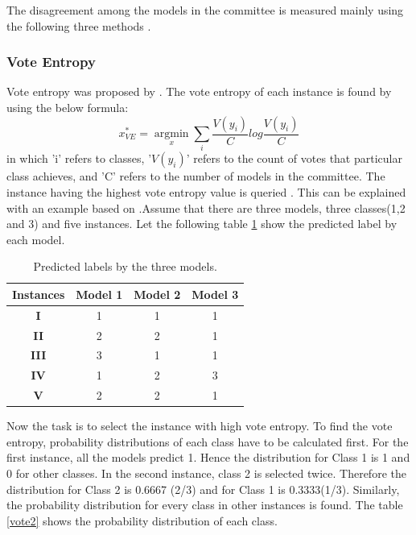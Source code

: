 The disagreement among the models in the committee is measured mainly using the following three methods \cite{Settles2010}.

\subsubsection{Vote Entropy}

Vote entropy was proposed by \cite{dagan1995committee}. The vote entropy of each instance is found by using the below formula: 
\begin{equation} 
x^{*}_{VE} = \operatorname*{argmin}_x \sum_{i} \frac{V(y_i)}{C} log\frac{V(y_i)}{C}
\end{equation} 
in which 'i' refers to classes, '$V(y_i)$' refers to the count of votes that particular class achieves, and 'C' refers to the  number of models in the committee. The instance having the highest vote entropy value is queried \cite{dagan1995committee} \cite{Settles2010}.
This can be explained with an example based on \cite{modal_disagree}.Assume that there are three models, three classes(1,2 and 3) and five instances. Let the following table \ref{vote1} show the predicted label by each model. \\
\begin{table}[h!]
\centering
	\begin{tabular}{|c|c|c|c|}
		\hline
		\textbf{Instances} & \textbf{Model 1} & \textbf{Model 2} & \textbf{Model 3} \\ \hline
		\textbf{I}         & 1                & 1                & 1                \\ \hline
		\textbf{II}        & 2                & 2                & 1                \\ \hline
		\textbf{III}       & 3                & 1                & 1                \\ \hline
		\textbf{IV}        & 1                & 2                & 3                \\ \hline
		\textbf{V}         & 2                & 2                & 1                \\ \hline
	\end{tabular}
\caption{Predicted labels by the three models.}
\label{vote1}
\end{table}
Now the task is to select the instance with high vote entropy.  To find the vote entropy, probability distributions of each class have to be calculated first.  For the first instance, all the models predict 1. Hence the distribution for Class 1 is 1 and 0 for other classes. In the second instance, class 2 is selected twice. Therefore the distribution for Class 2 is 0.6667 (2/3) and for Class 1 is 0.3333(1/3). Similarly, the probability distribution for every class in other instances is found. The table \ref{vote2} shows the probability distribution of each class.
